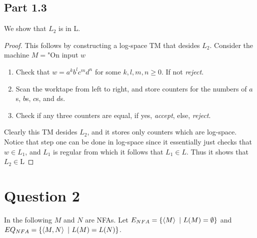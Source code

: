 \documentclass[a4paper,11pt]{article}
\newcommand{\pipe}{\ \vert \ }
\numberwithin{equation}{section}
\begin{document}
		\subsection*{Part 1.3}
		We show that $ L_2 $ is in L.
		\begin{proof}
			This follows by constructing a log-space TM that desides $ L_2 $. Consider the machine $ M= $"On input $ w $\begin{enumerate}
				\item Check that $ w=a^kb^lc^md^n $ for some $ k,l,m,n\geq0 $. If not \emph{reject}.
				\item Scan the worktape from left to right, and store counters for the numbers of $ a $s, $ b $s, $ c $s, and $ d $s.
				\item Check if any three counters are equal, if yes, \emph{accept}, else, \emph{reject}. 
			\end{enumerate}
			Clearly this TM desides $ L_2 $, and it stores only counters which are log-space. Notice that step one can be done in log-space since it essentially just checks that $ w\in L_1 $, and $ L_1 $ is regular from which it follows that $ L_1\in L $. Thus it shows that $ L_2\in \text{L} $
		\end{proof}
		\section*{Question 2}
	In the following $ M $ and $ N $ are NFAs. Let $ E_{NFA}=\{\braket{M}\pipe L(M)=\emptyset\} $ and\\ $ EQ_{NFA}=\{\braket{M,N}\pipe L(M)=L(N)\} $.
\end{document}
